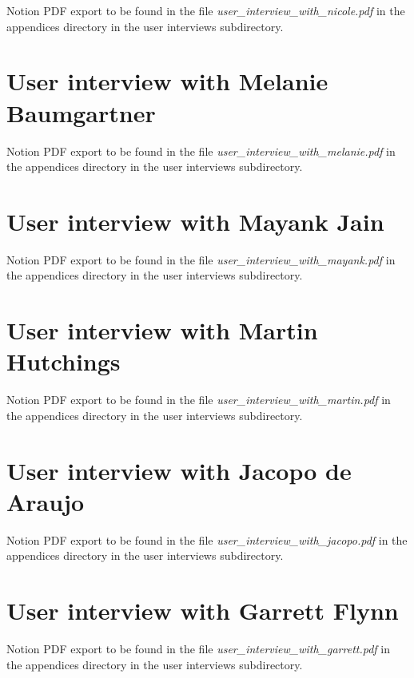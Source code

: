 Notion PDF export to be found in the file \textit{user\_interview\_with\_nicole.pdf} in the appendices directory in the user interviews subdirectory.

\section*{User interview with Melanie Baumgartner}

Notion PDF export to be found in the file \textit{user\_interview\_with\_melanie.pdf} in the appendices directory in the user interviews subdirectory.

\section*{User interview with Mayank Jain}

Notion PDF export to be found in the file \textit{user\_interview\_with\_mayank.pdf} in the appendices directory in the user interviews subdirectory.

\section*{User interview with Martin Hutchings}

Notion PDF export to be found in the file \textit{user\_interview\_with\_martin.pdf} in the appendices directory in the user interviews subdirectory.

\section*{User interview with Jacopo de Araujo}

Notion PDF export to be found in the file \textit{user\_interview\_with\_jacopo.pdf} in the appendices directory in the user interviews subdirectory.

\section*{User interview with Garrett Flynn}

Notion PDF export to be found in the file \textit{user\_interview\_with\_garrett.pdf} in the appendices directory in the user interviews subdirectory.


